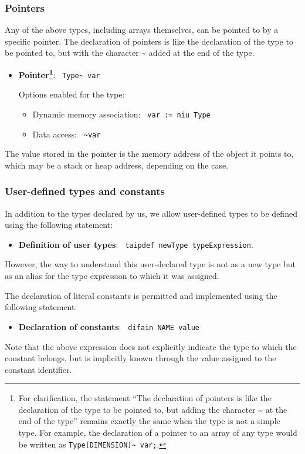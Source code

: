 \documentclass[10pt,a4paper]{article}
\begin{document}
\subsubsection{Pointers}
Any of the above types, including arrays themselves, can be pointed to by a specific pointer. The declaration of pointers is like the declaration of the type to be pointed to, but with the character \~{} added at the end of the type.
\begin{itemize}
    \item \textbf{Pointer\footnote{For clarification, the statement “The declaration of pointers is like the declaration of the type to be pointed to, but adding the character \~{} at the end of the type” remains exactly the same when the type is not a simple type. For example, the declaration of a pointer to an array of any type would be written as \texttt{Type[DIMENSION]\~{} var;}.}}: \texttt{\color{blue} Type\~{} var}
    
    Options enabled for the type:
    \begin{itemize}
        \item Dynamic memory association: \texttt{\color{blue} var := niu Type}
        \item Data access: \texttt{\color{blue} \~{}var}
    \end{itemize}
\end{itemize}
The value stored in the pointer is the memory address of the object it points to, which may be a stack or heap address, depending on the case.

\subsubsection{User-defined types and constants}
In addition to the types declared by us, we allow user-defined types to be defined using the following statement:
\begin{itemize}
    \item \textbf{Definition of user types}: \texttt{\color{blue} taipdef newType typeExpression}.
\end{itemize}
However, the way to understand this user-declared type is not as a new type but as an alias for the type expression to which it was assigned.

The declaration of literal constants is permitted and implemented using the following statement:
\begin{itemize}
    \item \textbf{Declaration of constants}: \texttt{\color{blue} difain NAME value}
\end{itemize}
Note that the above expression does not explicitly indicate the type to which the constant belongs, but is implicitly known through the value assigned to the constant identifier.
\end{document}
